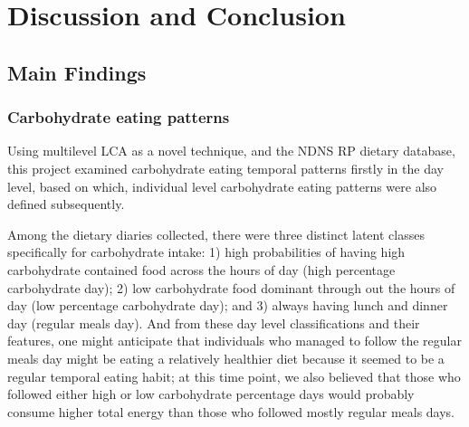 
\chapter{Discussion and Conclusion} %

\label{Chapter 4} %






\section{Main Findings}

\subsection{Carbohydrate eating patterns}

Using multilevel LCA as a novel technique, and the NDNS RP dietary database, this project examined carbohydrate eating temporal patterns firstly in the day level, based on which, individual level carbohydrate eating patterns were also defined subsequently. 

Among the dietary diaries collected, there were three distinct latent classes specifically for carbohydrate intake: 1) high probabilities of having high carbohydrate contained food across the hours of day (high percentage carbohydrate day); 2) low carbohydrate food dominant through out the hours of day (low percentage carbohydrate day); and 3) always having lunch and dinner day (regular meals day). And from these day level classifications and their features, one might anticipate that individuals who managed to follow the regular meals day might be eating a relatively healthier diet because it seemed to be a regular temporal eating habit; at this time point, we also believed that those who followed either high or low carbohydrate percentage days would probably consume higher total energy than those who followed mostly regular meals days. 

